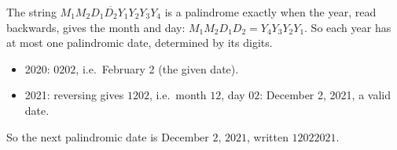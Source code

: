 The string $\overline{M_1M_2D_1D_2Y_1Y_2Y_3Y_4}$ is a palindrome exactly when the year, read backwards, gives the month and day: $M_1M_2D_1D_2=Y_4Y_3Y_2Y_1$. So each year has at most one palindromic date, determined by its digits.
\begin{itemize}
\item 2020: $0202$, i.e.\ February 2 (the given date).
\item 2021: reversing gives $1202$, i.e.\ month $12$, day $02$: December 2, 2021, a valid date.
\end{itemize}
So the next palindromic date is $\boxed{\text{December 2, 2021}}$, written $12022021$.
